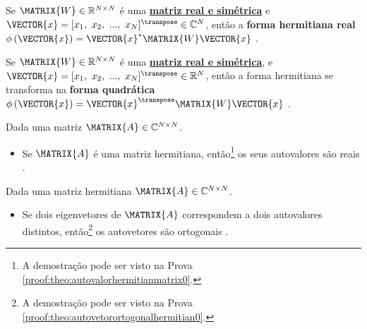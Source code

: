 \begin{definition}\label{def:formhermitianareal0}
Se $\MATRIX{W} \in \mathbb{R}^{N \times N}$ é uma \hyperref[def:symmetricmatrix0]{\textbf{matriz real e simétrica}}
e $\VECTOR{x}=[x_1,~x_2,~...,~x_N]^{\transpose}\in \mathbb{C}^{N}$,
então a \textbf{forma hermitiana real} 
$\phi\left(\VECTOR{x}\right) = \VECTOR{x}^{\ast}\MATRIX{W}\VECTOR{x}$ \cite[pp. 386]{mirsky2012introduction}.
\end{definition}

\begin{definition}\label{def:formhermitianareal1}
Se $\MATRIX{W} \in \mathbb{R}^{N \times N}$ é uma \hyperref[def:symmetricmatrix0]{\textbf{matriz real e simétrica}},
e  $\VECTOR{x}=[x_1,~x_2,~...,~x_N]^{\transpose}\in \mathbb{R}^{N}$,
então a forma hermitiana se transforma na \textbf{forma quadrática} 
$\phi\left(\VECTOR{x}\right) = \VECTOR{x}^{\transpose}\MATRIX{W}\VECTOR{x}$ \cite[pp. 386]{mirsky2012introduction}.
\end{definition}

\begin{theorem}\label{theo:autovalorhermitianmatrix0}
Dada uma matriz $\MATRIX{A} \in \mathbb{C}^{N \times N}$.
\begin{itemize}
\item Se $\MATRIX{A}$ é uma matriz hermitiana, então\footnote{A
demostração pode ser visto na Prova \ref{proof:theo:autovalorhermitianmatrix0}.} 
os seus autovalores são reais \cite[pp. 309]{robbin2018matrix}.
\end{itemize}
\end{theorem}

\begin{theorem}\label{theo:autovetorortogonalhermitian0}
Dada uma matriz hermitiana $\MATRIX{A} \in \mathbb{C}^{N \times N}$.
\begin{itemize}
\item Se dois eigenvetores de $\MATRIX{A}$ correspondem a dois autovalores distintos, então\footnote{A
demostração pode ser visto na Prova \ref{proof:theo:autovetorortogonalhermitian0}.} 
os autovetores são ortogonais \cite[pp. 309]{robbin2018matrix}.
\end{itemize}
\end{theorem}

